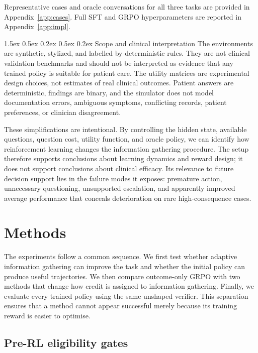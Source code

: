 \documentclass{article}
\makeatletter
\renewcommand{\paragraph}{%
  \@startsection{paragraph}{4}{\z@}%
                {1.5ex \@plus 0.5ex \@minus 0.2ex}%
                {0.5ex \@plus 0.2ex}%
                {\normalsize\bf}}
\makeatother
\begin{document}
Representative cases and oracle conversations for all three tasks are provided in
Appendix~\ref{app:cases}. Full SFT and GRPO hyperparameters are reported in
Appendix~\ref{app:impl}.

\paragraph{Scope and clinical interpretation}
The environments are synthetic, stylized, and labelled by deterministic rules.
They are not clinical validation benchmarks and should not be interpreted as
evidence that any trained policy is suitable for patient care. The utility matrices
are experimental design choices, not estimates of real clinical outcomes. Patient
answers are deterministic, findings are binary, and the simulator does not model
documentation errors, ambiguous symptoms, conflicting records, patient
preferences, or clinician disagreement.

These simplifications are intentional. By controlling the hidden state, available
questions, question cost, utility function, and oracle policy, we can identify how
reinforcement learning changes the information gathering procedure. The setup
therefore supports conclusions about learning dynamics and reward design; it does
not support conclusions about clinical efficacy. Its relevance to future decision
support lies in the failure modes it exposes: premature action, unnecessary
questioning, unsupported escalation, and apparently improved average performance
that conceals deterioration on rare high-consequence cases.

\section{Methods}
\label{sec:method}

The experiments follow a common sequence. We first test whether adaptive information
gathering can improve the task and whether the initial policy can produce useful
trajectories. We then compare outcome-only GRPO with two methods that change how
credit is assigned to information gathering. Finally, we evaluate every trained
policy using the same unshaped verifier. This separation ensures that a method
cannot appear successful merely because its training reward is easier to optimise.

\subsection{Pre-RL eligibility gates}
\label{subsec:gates}
\end{document}
